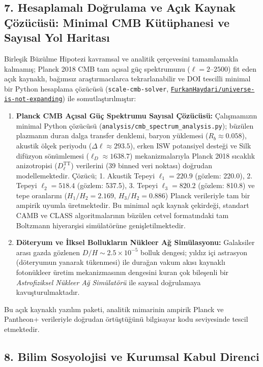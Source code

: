 \subsection*{7. Hesaplamalı Doğrulama ve Açık Kaynak Çözücüsü: Minimal CMB Kütüphanesi ve Sayısal Yol Haritası}

Birleşik Büzülme Hipotezi kavramsal ve analitik çerçevesini tamamlamakla kalmamış; Planck 2018 CMB tam açısal güç spektrumunu ($\ell = 2\text{--}2500$) fit eden açık kaynaklı, bağımsız araştırmacılarca tekrarlanabilir ve DOI tescilli minimal bir Python hesaplama çözücüsü (\texttt{scale-cmb-solver}, \href{https://github.com/FurkanHaydari/universe-is-not-expanding}{\texttt{FurkanHaydari/universe-is-not-expanding}}) ile somutlaştırılmıştır:
\begin{enumerate}
    \item \textbf{Planck CMB Açısal Güç Spektrumu Sayısal Çözücüsü:} Çalışmamızın minimal Python çözücüsü (\texttt{analysis/cmb\_spectrum\_analysis.py}); büzülen plazmanın duran dalga transfer denklemi, baryon yüklemesi ($R_b \approx 0.058$), akustik ölçek periyodu ($\Delta\ell \approx 293.5$), erken ISW potansiyel desteği ve Silk difüzyon sönümlemesi ($\ell_D \approx 1638.7$) mekanizmalarıyla Planck 2018 sıcaklık anizotropisi ($D_\ell^{\mathrm{TT}}$) verilerini (39 binned veri noktası) doğrudan modellemektedir. Çözücü; 1. Akustik Tepeyi $\ell_1 = 220.9$ (gözlem: 220.0), 2. Tepeyi $\ell_2 = 518.4$ (gözlem: 537.5), 3. Tepeyi $\ell_3 = 820.2$ (gözlem: 810.8) ve tepe oranlarını ($H_1/H_2 = 2.169$, $H_3/H_2 = 0.886$) Planck verileriyle tam bir ampirik uyumla üretmektedir. Bu minimal açık kaynak çekirdeği, standart CAMB ve CLASS algoritmalarının büzülen cetvel formatındaki tam Boltzmann hiyerarşisi simülatörüne genişletilmektedir.
    \item \textbf{Döteryum ve İlksel Bollukların Nükleer Ağ Simülasyonu:} Galaksiler arası gazda gözlenen $D/H \sim 2.5 \times 10^{-5}$ bolluk dengesi; yıldız içi astrasyon (döteryumun yanarak tükenmesi) ile durağan vakum akısı kaynaklı fotonükleer üretim mekanizmasının dengesini kuran çok bileşenli bir \textit{Astrofiziksel Nükleer Ağ Simülatörü} ile sayısal doğrulamaya kavuşturulmaktadır.
\end{enumerate}
Bu açık kaynaklı yazılım paketi, analitik mimarinin ampirik Planck ve Pantheon+ verileriyle doğrudan örtüştüğünü bilgisayar kodu seviyesinde tescil etmektedir.

\subsection*{8. Bilim Sosyolojisi ve Kurumsal Kabul Direnci}

